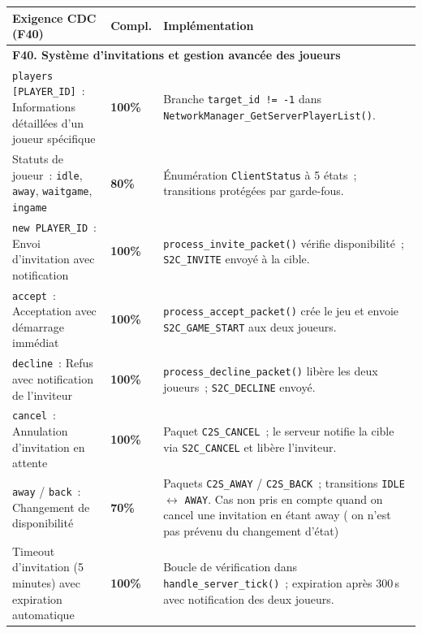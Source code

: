 \documentclass[a4paper]{article}
\begin{document}
 
\begin{table}[H]
\centering
\renewcommand{\arraystretch}{1.4}
\begin{tabular}{|p{6cm}|p{1.5cm}|p{8cm}|}
\hline
\textbf{Exigence CDC (F40)} & \textbf{Compl.} & \textbf{Implémentation} \\
\hline
\multicolumn{3}{|l|}{\textbf{F40. Système d'invitations et gestion avancée des joueurs}} \\
\hline
\texttt{players [PLAYER\_ID]}~: Informations détaillées d'un joueur spécifique
& \textbf{100\%}
& Branche \texttt{target\_id != -1} dans \texttt{NetworkManager\_GetServerPlayerList()}. \\
\hline
Statuts de joueur~: \texttt{idle}, \texttt{away}, \texttt{waitgame}, \texttt{ingame}
& \textbf{80\%}
& Énumération \texttt{ClientStatus} à 5 états~; transitions protégées par garde-fous. \\
\hline
\texttt{new PLAYER\_ID}~: Envoi d'invitation avec notification
& \textbf{100\%}
& \texttt{process\_invite\_packet()} vérifie disponibilité~; \texttt{S2C\_INVITE} envoyé à la cible. \\
\hline
\texttt{accept}~: Acceptation avec démarrage immédiat
& \textbf{100\%}
& \texttt{process\_accept\_packet()} crée le jeu et envoie \texttt{S2C\_GAME\_START} aux deux joueurs. \\
\hline
\texttt{decline}~: Refus avec notification de l'inviteur
& \textbf{100\%}
& \texttt{process\_decline\_packet()} libère les deux joueurs~; \texttt{S2C\_DECLINE} envoyé. \\
\hline
\texttt{cancel}~: Annulation d'invitation en attente
& \textbf{100\%}
& Paquet \texttt{C2S\_CANCEL}~; le serveur notifie la cible via \texttt{S2C\_CANCEL} et libère l'inviteur. \\
\hline
\texttt{away} / \texttt{back}~: Changement de disponibilité
& \textbf{70\%}
& Paquets \texttt{C2S\_AWAY} / \texttt{C2S\_BACK}~; transitions \texttt{IDLE} $\leftrightarrow$ \texttt{AWAY}. Cas non pris en compte quand on cancel une invitation en étant away ( on n'est pas prévenu du changement d'état) \\
\hline
Timeout d'invitation (5 minutes) avec expiration automatique
& \textbf{100\%}
& Boucle de vérification dans \texttt{handle\_server\_tick()}~; expiration après 300\,s avec notification des deux joueurs. \\

\end{tabular}
\end{table}
\end{document}
